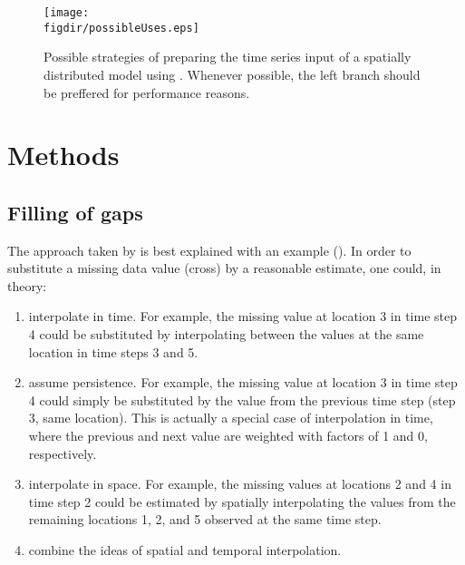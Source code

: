 \begin{figure*}
  \centering
  \texttt{[image: \\figdir/possibleUses.eps]}
  \caption[Possible strategies of preparing the time series input of a spatially distributed model using ]{Possible strategies of preparing the time series input of a spatially distributed model using . Whenever possible, the left branch should be preffered for performance reasons. \label{fig:meteofill:possibleUses}}
\end{figure*}

\section{Methods} \label{sec:meteofill:method}

\subsection{Filling of gaps} \label{sec:meteofill:filling}
The approach taken by  is best explained with an example (). In order to substitute a missing data value (cross) by a reasonable estimate, one could, in theory:
\begin{enumerate}
  \item interpolate in time. For example, the missing value at location 3 in time step 4 could be substituted by interpolating between the values at the same location in time steps 3 and 5.
  \item assume persistence. For example, the missing value at location 3 in time step 4 could simply be substituted by the value from the previous time step (step 3, same location). This is actually a special case of interpolation in time, where the previous and next value are weighted with factors of 1 and 0, respectively.
  \item interpolate in space. For example, the missing values at locations 2 and 4 in time step 2 could be estimated by spatially interpolating the values from the remaining locations 1, 2, and 5 observed at the same time step.
  \item combine the ideas of spatial and temporal interpolation.
\end{enumerate}

